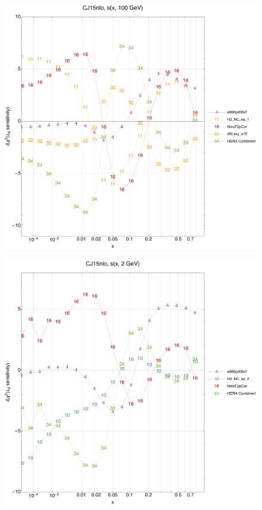 \documentclass[10pt,aps,prd,floatfix,titlepage]{revtex4}
\begin{document}
\clearpage
\begin{figure}
\includegraphics[width=\textwidth,height=0.44\textheight,keepaspectratio]{1/ifl3_CJ15nlo_L2_q100_Sf_1.pdf}
\caption{}
\end{figure}
\begin{figure}
\includegraphics[width=\textwidth,height=0.44\textheight,keepaspectratio]{1/ifl3_CJ15nlo_L2_q2_Sf_1.pdf}
\caption{}
\end{figure}
\end{document}
